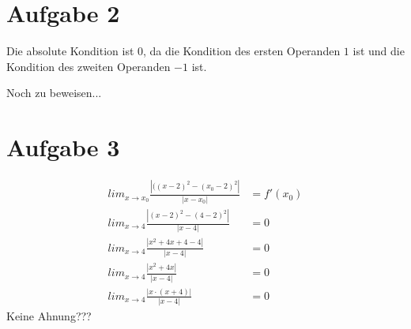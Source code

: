 \documentclass{llncs}
\begin{document}
\section*{Aufgabe 2}

Die absolute Kondition ist $0$, da die Kondition des ersten Operanden $1$ ist und die Kondition des zweiten Operanden $-1$ ist.

Noch zu beweisen...
\section*{Aufgabe 3}

\begin{align*}
lim_{x \rightarrow x_0} \frac{|((x-2)^2 - (x_0-2)^2|}{|x-x_0|} &= f'(x_0) \\
lim_{x \rightarrow 4} \frac{|(x-2)^2 - (4-2)^2|}{|x-4|} &= 0 \\
lim_{x \rightarrow 4} \frac{|x^2 + 4x + 4 - 4|}{|x-4|} &= 0 \\
lim_{x \rightarrow 4} \frac{|x^2 + 4x|}{|x-4|} &= 0 \\
lim_{x \rightarrow 4} \frac{|x \cdot (x + 4)|}{|x-4|} &= 0
\end{align*}
Keine Ahnung???
\end{document}
